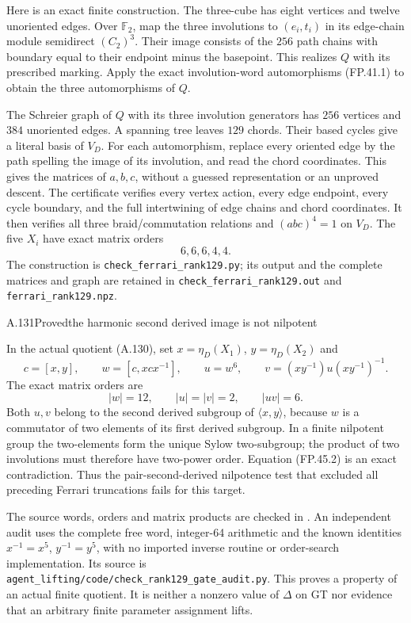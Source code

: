 Here is an exact finite construction. The three-cube has
eight vertices and twelve unoriented edges. Over $\mathbb F_2$,
map the three involutions to $(e_i,t_i)$ in its edge-chain
module semidirect $(C_2)^3$. Their image consists of the
$256$ path chains with boundary equal to their endpoint minus
the basepoint. This realizes $Q$ with its prescribed marking.
Apply the exact involution-word automorphisms (FP.41.1) to
obtain the three automorphisms of $Q$.

The Schreier graph of $Q$ with its three involution generators
has $256$ vertices and $384$ unoriented edges. A spanning
tree leaves $129$ chords. Their based cycles give a literal
basis of $V_D$. For each automorphism, replace every oriented
edge by the path spelling the image of its involution, and
read the chord coordinates. This gives the matrices of
$a,b,c$, without a guessed representation or an unproved
descent. The certificate verifies every vertex action, every
edge endpoint, every cycle boundary, and the full intertwining
of edge chains and chord coordinates. It then verifies all
three braid/commutation relations and $(abc)^4=1$ on
$V_D$. The five $X_i$ have exact matrix orders
\[
                         6,6,6,4,4.
 \tag{FP.44.3}
\]
The construction is \texttt{check\_ferrari\_rank129.py}; its
output and the complete matrices and graph are retained in
\texttt{check\_ferrari\_rank129.out} and
\texttt{ferrari\_rank129.npz}.

\begin{statement}{A.131}{Proved}{the harmonic second derived image is not nilpotent}
\end{statement}
In the actual quotient (A.130), set $x=\eta_D(X_1)$,
$y=\eta_D(X_2)$ and
\[
 c=[x,y],\qquad w=[c,xcx^{-1}],\qquad
 u=w^6,\qquad v=(xy^{-1})u(xy^{-1})^{-1}.
 \tag{FP.45.1}
\]
The exact matrix orders are
\[
                  |w|=12,\qquad |u|=|v|=2,
                              \qquad |uv|=6.
 \tag{FP.45.2}
\]
Both $u,v$ belong to the second derived subgroup of
$\langle x,y\rangle$, because $w$ is a commutator of two
elements of its first derived subgroup. In a finite nilpotent
group the two-elements form the unique Sylow two-subgroup;
the product of two involutions must therefore have two-power
order. Equation (FP.45.2) is an exact contradiction.
Thus the pair-second-derived nilpotence test that excluded
all preceding Ferrari truncations fails for this target.

The source words, orders and matrix products are checked in
. An independent audit
uses the complete free word, integer-64 arithmetic and the
known identities $x^{-1}=x^5$, $y^{-1}=y^5$, with no imported
inverse routine or order-search implementation. Its source
is \texttt{agent\_lifting/code/check\_rank129\_gate\_audit.py}.
This proves a property of an actual finite quotient. It is
neither a nonzero value of $\Delta$ on GT nor evidence that
an arbitrary finite parameter assignment lifts.

